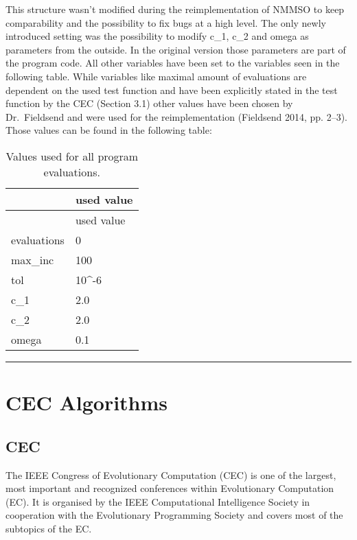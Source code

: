 \documentclass[12pt,a4paper]{article}
\begin{document}
This structure wasn't modified during the reimplementation of NMMSO to
keep comparability and the possibility to fix bugs at a high level. The
only newly introduced setting was the possibility to modify c\_1, c\_2
and omega as parameters from the outside. In the original version those
parameters are part of the program code. All other variables have been
set to the variables seen in the following table. While variables like
maximal amount of evaluations are dependent on the used test function
and have been explicitly stated in the test function by the CEC (Section
3.1) other values have been chosen by Dr.~Fieldsend and were used for
the reimplementation (Fieldsend 2014, pp. 2--3). Those values can be
found in the following table:

\begin{longtable}[c]{@{}ll@{}}
\caption{Values used for all program evaluations.}\tabularnewline
\toprule
& used value\tabularnewline
\midrule
\endfirsthead
\toprule
& used value\tabularnewline
\midrule
\endhead
evaluations & 0\tabularnewline
max\_inc & 100\tabularnewline
tol & 10\^{}-6\tabularnewline
c\_1 & 2.0\tabularnewline
c\_2 & 2.0\tabularnewline
omega & 0.1\tabularnewline
\bottomrule
\end{longtable}

\begin{center}\rule{0.5\linewidth}{\linethickness}\end{center}

\section{CEC Algorithms}\label{cec-algorithms}

\subsection{CEC}\label{cec}

The IEEE Congress of Evolutionary Computation (CEC) is one of the
largest, most important and recognized conferences within Evolutionary
Computation (EC). It is organised by the IEEE Computational Intelligence
Society in cooperation with the Evolutionary Programming Society and
covers most of the subtopics of the EC.
\end{document}
